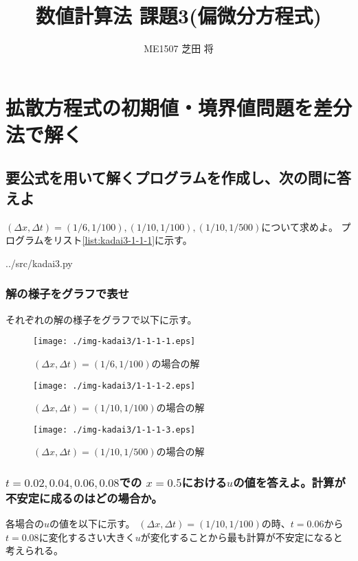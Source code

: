 \documentclass[]{jsarticle}
\title{\LARGE {数値計算法 課題3(偏微分方程式)}}
\author{\large {ME1507 芝田 将}}
\begin{document}
\maketitle

\section{拡散方程式の初期値・境界値問題を差分法で解く}

\subsection{要公式を用いて解くプログラムを作成し、次の問に答えよ}

$(\Delta x, \Delta t) = (1/6, 1/100), (1/10, 1/100), (1/10, 1/500)$について求めよ。
プログラムをリスト\ref{list:kadai3-1-1-1}に示す。


{../src/kadai3.py}

\subsubsection{解の様子をグラフで表せ}

それぞれの解の様子をグラフで以下に示す。

\begin{figure}[H]
\centering
\texttt{[image: ./img-kadai3/1-1-1-1.eps]}
\caption{$(\Delta x, \Delta t) = (1/6, 1/100)$の場合の解}
\label{list:1-1-1-1}
\end{figure}

\begin{figure}[H]
\centering
\texttt{[image: ./img-kadai3/1-1-1-2.eps]}
\caption{$(\Delta x, \Delta t) = (1/10, 1/100)$の場合の解}
\label{list:1-1-1-2}
\end{figure}

\begin{figure}[H]
\centering
\texttt{[image: ./img-kadai3/1-1-1-3.eps]}
\caption{$(\Delta x, \Delta t) = (1/10, 1/500)$の場合の解}
\label{list:1-1-1-3}
\end{figure}


\subsubsection{$t=0.02, 0.04, 0.06, 0.08$での $x = 0.5$における$u$の値を答えよ。計算が不安定に成るのはどの場合か。}

各場合の$u$の値を以下に示す。
$(\Delta x, \Delta t) = (1/10, 1/100)$の時、$t=0.06$から$t=0.08$に変化するさい大きく$u$が変化することから最も計算が不安定になると考えられる。
\end{document}
